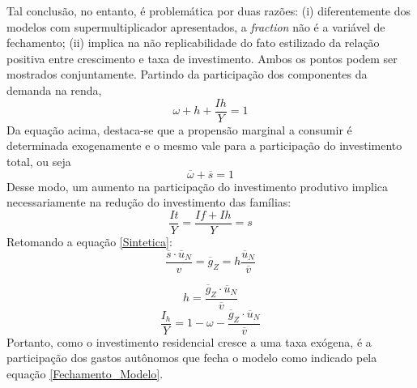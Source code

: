 Tal conclusão, no entanto, é problemática por duas razões: (i) diferentemente dos modelos com supermultiplicador apresentados, a \textit{fraction} não é a variável de fechamento; (ii) implica na não replicabilidade do fato estilizado da relação positiva entre crescimento e taxa de investimento. Ambos os pontos podem ser mostrados conjuntamente. Partindo da participação dos componentes da demanda na renda,
$$
\omega + h + \frac{Ih}{Y} = 1
$$
Da equação acima, destaca-se que a propensão marginal a consumir é determinada exogenamente e o mesmo vale para a participação do investimento total, ou seja
$$
\overline \omega + \overline s = 1
$$
Desse modo, um aumento na participação do investimento produtivo implica necessariamente na redução do investimento das famílias:
$$
\frac{It}{Y} = \frac{If + Ih}{Y} = s
$$
Retomando a equação \ref{Sintetica}:
$$
\frac{\overline s\cdot \overline u_N}{v} = \overline g_Z = h\frac{\overline u_N}{\overline v}
$$

\begin{equation}
h = \frac{\overline g_Z\cdot \overline u_N}{\overline v}
\end{equation}
\begin{equation}
    \label{Fechamento_Modelo}
\frac{I_h}{Y} = 1 - \omega - \frac{\overline g_Z\cdot \overline u_N}{\overline v}
\end{equation}
Portanto, como o investimento residencial cresce a uma taxa exógena, é a participação dos gastos autônomos que fecha o modelo como indicado pela equação \ref{Fechamento_Modelo}. 